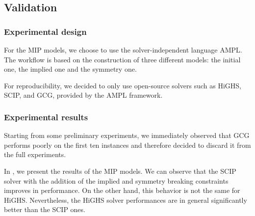 \subsection{Validation}

\subsubsection{Experimental design}

For the MIP models, we choose to use the solver-independent language AMPL. The workflow is based on the construction of three different models: the initial one, the implied one and the symmetry one.

For reproducibility, we decided to only use open-source solvers such as HiGHS, SCIP, and GCG, provided by the AMPL framework.


\subsubsection{Experimental results}

Starting from some preliminary experiments, we immediately observed that GCG performs poorly on the first ten instances and therefore decided to discard it from the full experiments.

In , we present the results of the MIP models. We can observe that the SCIP solver with the addition of the implied and symmetry breaking constraints improves in performance. On the other hand, this behavior is not the same for HiGHS.
Nevertheless, the HiGHS solver performances are in general significantly better than the SCIP ones.

